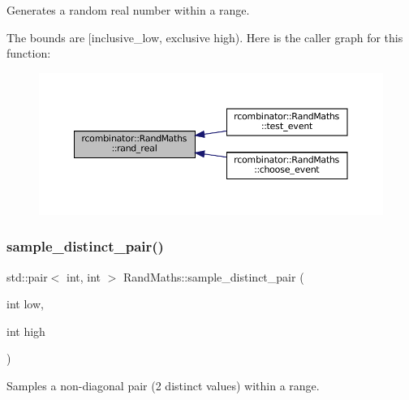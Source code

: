 Generates a random real number within a range. 

The bounds are \mbox{[}inclusive\+\_\+low, exclusive high). Here is the caller graph for this function\+:
\nopagebreak
\begin{figure}[H]
\begin{center}
\leavevmode
\includegraphics[width=350pt]{classrcombinator_1_1RandMaths_aa6441baa59bff50f588c0c54e3c54140_icgraph}
\end{center}
\end{figure}
\mbox{\label{classrcombinator_1_1RandMaths_aaa759efa3059b6793100cb6b6442f26d}} 
\subsubsection{\texorpdfstring{sample\+\_\+distinct\+\_\+pair()}{sample\_distinct\_pair()}}
{\footnotesize\ttfamily std\+::pair$<$ int, int $>$ Rand\+Maths\+::sample\+\_\+distinct\+\_\+pair (\begin{DoxyParamCaption}\item[{int}]{low,  }\item[{int}]{high }\end{DoxyParamCaption})}



Samples a non-\/diagonal pair (2 distinct values) within a range. 

